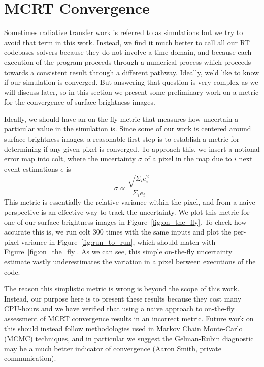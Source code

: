 \section{MCRT Convergence}
Sometimes radiative transfer work is referred to as simulations but we try to avoid that term in this work.
Instead, we find it much better to call all our RT codebases solvers because they do not involve a time domain, and because each execution of the program proceeds through a numerical process which proceeds towards a consistent result through a different pathway.
Ideally, we'd like to know if our simulation is converged.
But answering that question is very complex as we will discuss later, so in this section we present some preliminary work on a metric for the convergence of surface brightness images.

Ideally, we should have an on-the-fly metric that measures how uncertain a particular value in the simulation is.
Since some of our work is centered around surface brightness images, a reasonable first step is to establish a metric for determining if any given pixel is converged.
To approach this, we insert a notional error map into {\sc colt}, where the uncertainty $\sigma$ of a pixel in the map due to $i$ next event estimations $e$ is
\begin{equation}
    \sigma \propto \frac{\sqrt{\Sigma_{i} e_{i}^{2}}}{\Sigma_{i} e_{i}}
    \label{eq:sb_uncertainty}
\end{equation}
This metric is essentially the relative variance within the pixel, and from a naive perspective is an effective way to track the uncertainty.
We plot this metric for one of our surface brightness images in Figure~\ref{fig:on_the_fly}.
To check how accurate this is, we run {\sc colt} 300 times with the same inputs and plot the per-pixel variance in Figure~\ref{fig:run_to_run}, which should match with Figure~\ref{fig:on_the_fly}.
As we can see, this simple on-the-fly uncertainty estimate vastly underestimates the variation in a pixel between executions of the code.

The reason this simplistic metric is wrong is beyond the scope of this work.
Instead, our purpose here is to present these results because they cost many CPU-hours and we have verified that using a naive approach to on-the-fly assessment of MCRT convergence results in an incorrect metric.
Future work on this should instead follow methodologies used in Markov Chain Monte-Carlo (MCMC) techniques, and in particular we suggest the Gelman-Rubin diagnostic may be a much better indicator of convergence (Aaron Smith, private communication).

